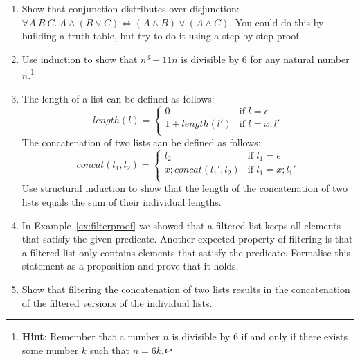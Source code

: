 \documentclass{tufte-handout}
\newcounter{exc:first:proof}
\newcounter{theExerciseCounter}
\begin{document}
\begin{enumerate}
\setcounter{enumi}{\value{theExerciseCounter}}
\setcounter{exc:first:proof}{\value{enumi}}
\item
  Show that conjunction distributes over disjunction:\\
  $\forall A~B~C. ~A \land (B \lor C) \iff (A \land B) \lor (A
  \land C)$. You could do this by building a truth table, but try
  to do it using a step-by-step proof.
\item Use induction to show that $n^3 + 11n$ is divisible by $6$
  for any natural number $n$.\footnote{\textbf{Hint}: Remember
    that a number $n$ is divisible by $6$ if and only if there
    exists some number $k$ such that $n = 6k$. }
\item The length of a list can be defined as follows:
  \[
  \mathit{length}(l) =
  \begin{cases}
    0 & \text{if } l = \epsilon\\
    1 + \mathit{length}(l')& \text{if } l = x; l'\\
  \end{cases}
  \]
  The concatenation of two lists can be defined as follows:
  \[
  \mathit{concat}(l_1, l_2) =
  \begin{cases}
    l_2 & \text{if } l_1 = \epsilon\\
    x; \mathit{concat}(l_1', l_2) & \text{if } l_1 = x; l_1'\\
  \end{cases}
  \]
  Use structural induction to show that the length of the
  concatenation of two lists equals the sum of their individual
  lengths.
\item In Example~\ref{ex:filterproof} we showed that a filtered
  list keeps all elements that satisfy the given predicate.
  Another expected property of filtering is that a filtered list
  only contains elements that satisfy the predicate. Formalise
  this statement as a proposition and prove that it holds.
\item Show that filtering the concatenation of two lists results
  in the concatenation of the filtered versions of the individual
  lists.
\end{enumerate}


\end{document}
